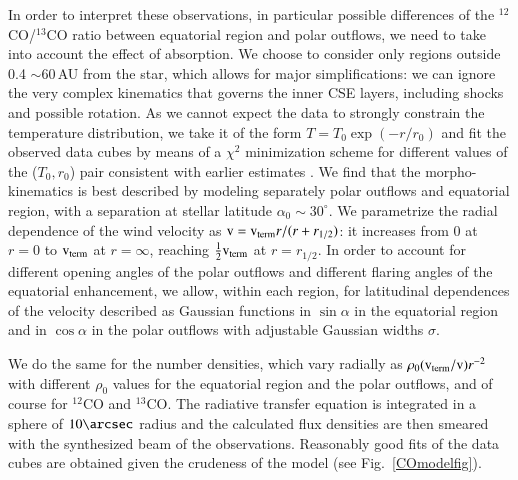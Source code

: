 \documentclass{aa}
\begin{document}
In order to interpret these observations, in particular possible
differences of the $^{12}$CO/$^{13}$CO ratio between equatorial region
and polar outflows, we need to take into account the effect of
absorption. We choose to consider only regions outside 0.4\arcsec
$\sim$60\,AU from the star, which allows for major simplifications: we
can ignore the very complex kinematics that governs the inner CSE
layers, including shocks and possible rotation.  As we cannot expect
the data to strongly constrain the temperature distribution, we take
it of the form $T=T_0\exp(-r/r_0)$ and fit the observed data cubes by
means of a $\chi^2$ minimization scheme for different values of the
($T_0,r_0$) pair consistent with earlier estimates
\citep{2015RAA....15..713N}.  We find that the morpho-kinematics is
best described by modeling separately polar outflows and equatorial
region, with a separation at stellar latitude $\alpha_0 \sim
30^{\circ}$. We parametrize the radial dependence of the wind velocity
as ${\rm v=v_{term}} r/(r+r_{1/2})$: it increases from 0 at $r=0$ to
${\rm v_{term}}$ at $r=\infty$, reaching $\frac{1}{2} {\rm v_{term}}$
at $r=r_{1/2}$. In order to account for different opening angles of
the polar outflows and different flaring angles of the equatorial
enhancement, we allow,  within each region, for latitudinal
dependences of the velocity described as Gaussian functions in $\sin
\alpha$ in the equatorial region and in $\cos \alpha$ in the polar
outflows with adjustable Gaussian widths $\sigma$.

We do the same for the number densities, which vary radially  as
$\rho_0 ({\rm v_{term}/v})r^{-2}$ with different $\rho_0$ values for
the equatorial region and the polar outflows, and of course for
$^{12}$CO and $^{13}$CO. The radiative transfer equation is integrated
in a sphere of $10\arcsec$ radius and the calculated flux densities
are then smeared with the synthesized beam of the observations.
Reasonably good fits of the data cubes are obtained given the
crudeness of the model (see Fig.~\ref{COmodelfig}).
\end{document}
